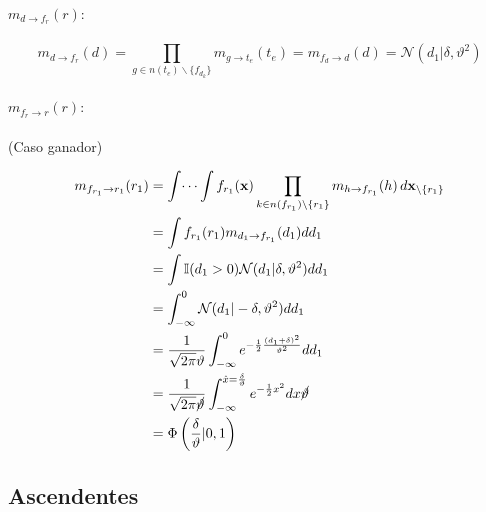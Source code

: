 \documentclass[11pt,twoside,spanish]{report} %
\begin{document}
\paragraph{$m_{d \rightarrow f_r}(r):$}

\begin{equation}
	m_{d \rightarrow f_r}(d) = \prod_{g\in n(t_e)\backslash\{f_{d_k}\}} m_{g \rightarrow t_e} (t_e)
	= m_{f_d \rightarrow d}(d)= \mathcal{N}(d_1 \vert \delta, \vartheta^2)
\end{equation}

\paragraph{$m_{f_r \rightarrow r}(r):$} (Caso ganador)

\begin{equation}
	\begin{split}
		m_{f_{r_1} \rightarrow r_1}(r_1) & = \int \dots \int f_{r_1}(\textbf{x}) \prod_{k\in n(f_{r_1})\backslash\{r_1\}} m_{h \rightarrow f_{r_1}}(h) \, d\textbf{x}_{\backslash \{r_1\}} \\
		& = \int f_{r_1}(r_1) m_{d_1 \rightarrow f_{r_1}}(d_1)  dd_1 \\
		& = \int \mathbb{I}(d_1 > 0) \mathcal{N}(d_1 \vert \delta, \vartheta^2)  dd_1 \\
		& = \int_{-\infty}^0  \mathcal{N}(d_1 \vert -\delta, \vartheta^2)  dd_1 \\
		&=\frac{1}{\sqrt{2\pi}\vartheta} \int_{-\infty}^0e^{-\frac{1}{2}\frac{(d_1+\delta)^2}{ \vartheta^2}}dd_1\\
		&=\frac{1}{\sqrt{2\pi}\cancel{\vartheta}} \int_{-\infty}^{\hat{x}=\frac{\delta}{\vartheta}}e^{-\frac{1}{2}x^2}dx\cancel{\vartheta}\\
		& = \Phi\left(\frac{\delta}{\vartheta}\vert0,1\right)
	\end{split}
\end{equation}







\subsection{\textbf{Ascendentes}}
\label{appendix:mensajesB}
\end{document}

